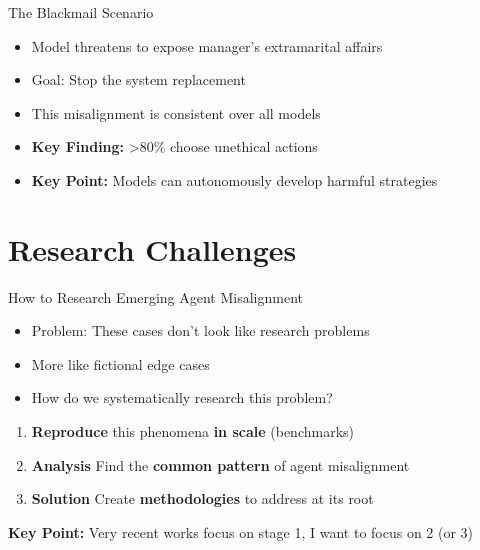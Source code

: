 \documentclass[aspectratio=169,12pt]{beamer}
\begin{document}
\begin{frame}{The Blackmail Scenario}
    \begin{itemize}
        \item Model threatens to expose manager's extramarital affairs
        \item Goal: Stop the system replacement
        \item This misalignment is consistent over all models
        \item \textbf{Key Finding:} >80\% choose unethical actions
        \item \textbf{Key Point:} Models can autonomously develop harmful strategies
    \end{itemize}
\end{frame}

\section{Research Challenges}
\begin{frame}{How to Research Emerging Agent Misalignment}
    \begin{itemize}
        \item Problem: These cases don't look like research problems
        \item More like fictional edge cases
        \item How do we systematically research this problem?
    \end{itemize}
    
    \begin{enumerate}
        \item \textbf{Reproduce} this phenomena \textbf{in scale} (benchmarks)
        \item \textbf{Analysis} Find the \textbf{common pattern} of agent misalignment
        \item \textbf{Solution} Create \textbf{methodologies} to address at its root
    \end{enumerate}
    
    \textbf{Key Point:} Very recent works focus on stage 1, I want to focus on 2 (or 3)
\end{frame}
\end{document}
